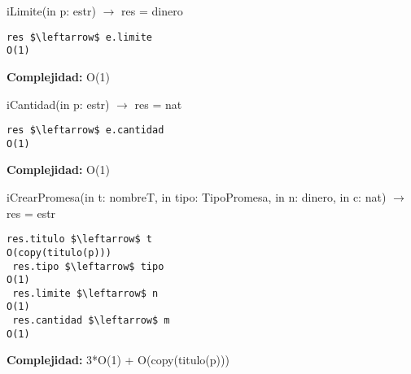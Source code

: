 iLimite(in p: estr) $\rightarrow$ res = dinero
\begin{lstlisting}[mathescape]
 res $\leftarrow$ e.limite                                                                O(1)
\end{lstlisting}
\textbf{Complejidad:} O(1)


iCantidad(in p: estr) $\rightarrow$ res = nat
\begin{lstlisting}[mathescape]
 res $\leftarrow$ e.cantidad                                                              O(1)
\end{lstlisting}
\textbf{Complejidad:} O(1)

iCrearPromesa(in t: nombreT, in tipo: TipoPromesa, in n: dinero, in c: nat) $\rightarrow$ res = estr
\begin{lstlisting}[mathescape]
 res.titulo $\leftarrow$ t                                                            O(copy(titulo(p)))
 res.tipo $\leftarrow$ tipo                                                               O(1)
 res.limite $\leftarrow$ n                                                                O(1)
 res.cantidad $\leftarrow$ m                                                              O(1)
\end{lstlisting}
\textbf{Complejidad:} 3*O(1) + O(copy(titulo(p)))


